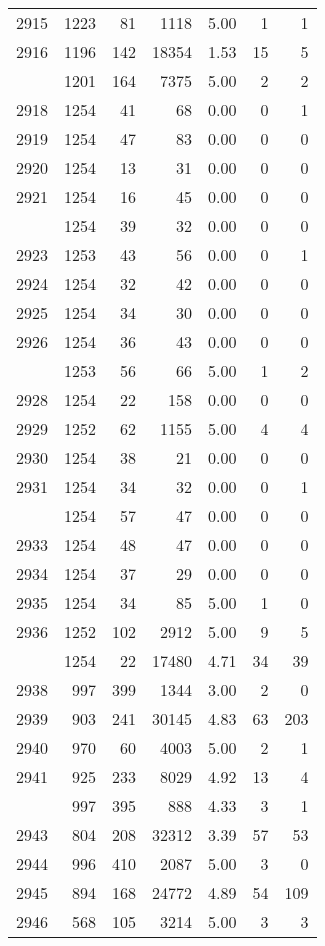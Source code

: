 \documentclass[
]{article}
\begin{document}
\begin{table}
\begin{tabular}[t]{lrrrrrr}
2915 & 1223 & 81 & 1118 & 5.00 & 1 & 1\\
2916 & 1196 & 142 & 18354 & 1.53 & 15 & 5\\
\addlinespace
2917 & 1201 & 164 & 7375 & 5.00 & 2 & 2\\
2918 & 1254 & 41 & 68 & 0.00 & 0 & 1\\
2919 & 1254 & 47 & 83 & 0.00 & 0 & 0\\
2920 & 1254 & 13 & 31 & 0.00 & 0 & 0\\
2921 & 1254 & 16 & 45 & 0.00 & 0 & 0\\
\addlinespace
2922 & 1254 & 39 & 32 & 0.00 & 0 & 0\\
2923 & 1253 & 43 & 56 & 0.00 & 0 & 1\\
2924 & 1254 & 32 & 42 & 0.00 & 0 & 0\\
2925 & 1254 & 34 & 30 & 0.00 & 0 & 0\\
2926 & 1254 & 36 & 43 & 0.00 & 0 & 0\\
\addlinespace
2927 & 1253 & 56 & 66 & 5.00 & 1 & 2\\
2928 & 1254 & 22 & 158 & 0.00 & 0 & 0\\
2929 & 1252 & 62 & 1155 & 5.00 & 4 & 4\\
2930 & 1254 & 38 & 21 & 0.00 & 0 & 0\\
2931 & 1254 & 34 & 32 & 0.00 & 0 & 1\\
\addlinespace
2932 & 1254 & 57 & 47 & 0.00 & 0 & 0\\
2933 & 1254 & 48 & 47 & 0.00 & 0 & 0\\
2934 & 1254 & 37 & 29 & 0.00 & 0 & 0\\
2935 & 1254 & 34 & 85 & 5.00 & 1 & 0\\
2936 & 1252 & 102 & 2912 & 5.00 & 9 & 5\\
\addlinespace
2937 & 1254 & 22 & 17480 & 4.71 & 34 & 39\\
2938 & 997 & 399 & 1344 & 3.00 & 2 & 0\\
2939 & 903 & 241 & 30145 & 4.83 & 63 & 203\\
2940 & 970 & 60 & 4003 & 5.00 & 2 & 1\\
2941 & 925 & 233 & 8029 & 4.92 & 13 & 4\\
\addlinespace
2942 & 997 & 395 & 888 & 4.33 & 3 & 1\\
2943 & 804 & 208 & 32312 & 3.39 & 57 & 53\\
2944 & 996 & 410 & 2087 & 5.00 & 3 & 0\\
2945 & 894 & 168 & 24772 & 4.89 & 54 & 109\\
2946 & 568 & 105 & 3214 & 5.00 & 3 & 3\\

\end{tabular}
\end{table}
\end{document}
